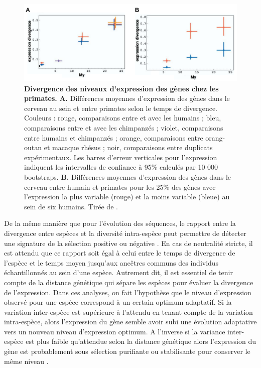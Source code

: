 \begin{figure}[h]
 \centering
 \includegraphics[width=1\textwidth, page=1] {figures/introduction/fig24.png}
 \caption[Divergence des niveaux d'expression des gènes chez les primates.]{
 \textbf{Divergence des niveaux d'expression des gènes chez les primates.}
 \textbf{A.} Différences moyennes d'expression des gènes dans le cerveau au sein et entre primates selon le temps de divergence. Couleurs : rouge, comparaisons entre et avec les humains ; bleu, comparaisons entre et avec les chimpanzés ; violet, comparaisons entre humains et chimpanzés ; orange, comparaisons entre orang-outan et macaque rhésus ; noir, comparaisons entre duplicats expérimentaux. Les barres d'erreur verticales pour l'expression indiquent les intervalles de confiance à 95\% calculés par 10 000 bootstraps. \textbf{B.} Différences moyennes d'expression des gènes dans le cerveau entre humain et primates pour les 25\% des gènes avec l'expression la plus variable (rouge) et la moins variable (bleue) au sein de six humains. Tirée de \citet{khaitovich_neutral_2004}.\\
 }
 \label{fig:Fig24}
\end{figure} 

De la même manière que pour l’évolution des séquences, le rapport entre la divergence entre espèces et la diversité intra-espèce peut permettre de détecter une signature de la sélection positive ou négative \citep{mcdonald_adaptive_1991}. En cas de neutralité stricte, il est attendu que ce rapport soit égal à celui entre le temps de divergence de l'espèce et le temps moyen jusqu'aux ancêtres communs des individus échantillonnés au sein d'une espèce. Autrement dit, il est essentiel de tenir compte de la distance génétique qui sépare les espèces pour évaluer la divergence de l'expression. Dans ces analyses, on fait l'hypothèse que le niveau d'expression observé pour une espèce correspond à un certain optimum adaptatif. Si la variation inter-espèce est supérieure à l’attendu en tenant compte de la variation intra-espèce, alors l’expression du gène semble avoir subi une évolution adaptative vers un nouveau niveau d’expression optimum. A l’inverse si la variance inter-espèce est plus faible qu’attendue selon la distance génétique alors l’expression du gène est probablement sous sélection purifiante ou stabilisante pour conserver le même niveau \citep{khaitovich_neutral_2004}.

